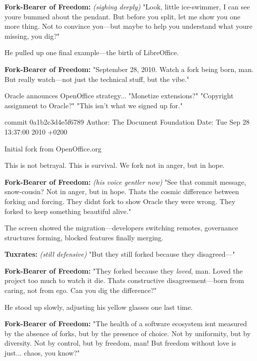 \textbf{Fork-Bearer of Freedom:} \emph{(sighing deeply)} "Look, little ice-swimmer, I can see you\textquotesingle re bummed about the pendant. But before you split, let me show you one more thing. Not to convince you---but maybe to help you understand what you\textquotesingle re missing, you dig?"

He pulled up one final example---the birth of LibreOffice.

\textbf{Fork-Bearer of Freedom:} "September 28, 2010. Watch a fork being born, man. But really watch---not just the technical stuff, but the vibe."

\begin{codeblock}
Oracle announces OpenOffice strategy...
"Monetize extensions?"
"Copyright assignment to Oracle?"
"This isn't what we signed up for."
\end{codeblock}

\begin{codeblock}
commit 0a1b2c3d4e5f6789
Author: The Document Foundation
Date: Tue Sep 28 13:37:00 2010 +0200

    Initial fork from OpenOffice.org
    
    This is not betrayal. This is survival.
    We fork not in anger, but in hope.
\end{codeblock}

\textbf{Fork-Bearer of Freedom:} \emph{(his voice gentler now)} "See that commit message, snow-cousin? \textquotesingle Not in anger, but in hope.\textquotesingle{} That\textquotesingle s the cosmic difference between forking and forcing. They didn\textquotesingle t fork to show Oracle they were wrong. They forked to keep something beautiful alive."

The screen showed the migration---developers switching remotes, governance structures forming, blocked features finally merging.

\textbf{Tuxrates:} \emph{(still defensive)} "But they still forked because they disagreed---"

\textbf{Fork-Bearer of Freedom:} "They forked because they \emph{loved}, man. Loved the project too much to watch it die. That\textquotesingle s constructive disagreement---born from caring, not from ego. Can you dig the difference?"

He stood up slowly, adjusting his yellow glasses one last time.

\textbf{Fork-Bearer of Freedom:} "The health of a software ecosystem isn\textquotesingle t measured by the absence of forks, but by the presence of choice. Not by uniformity, but by diversity. Not by control, but by freedom, man! But freedom without love is just... chaos, you know?"

